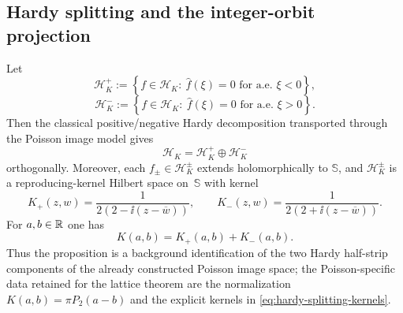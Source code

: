 
\subsection{Hardy splitting and the integer-orbit projection}

\begin{proposition}%
\label{prop:poisson-hardy-splitting}
Let
\[
\mathcal H_K^+
:=
\left\{
f\in\mathcal H_K:\ \widehat f(\xi)=0 \text{ for a.e. }\xi<0
\right\},
\]
\[
\mathcal H_K^-
:=
\left\{
f\in\mathcal H_K:\ \widehat f(\xi)=0 \text{ for a.e. }\xi>0
\right\}.
\]
Then the classical positive/negative Hardy decomposition transported through
the Poisson image model gives
\[
\mathcal H_K=\mathcal H_K^+\oplus \mathcal H_K^-
\]
orthogonally.  Moreover, each $f_\pm\in\mathcal H_K^\pm$ extends
holomorphically to $\mathbb S$, and $\mathcal H_K^\pm$ is a
reproducing-kernel Hilbert space on~$\mathbb S$ with kernel
\begin{equation}\label{eq:hardy-splitting-kernels}
K_+(z,w)=\frac{1}{2(2-\ii(z-\overline w))},
\qquad
K_-(z,w)=\frac{1}{2(2+\ii(z-\overline w))}.
\end{equation}
For $a,b\in\mathbb{R}$ one has
\begin{equation}\label{eq:hardy-splitting-real-kernel}
K(a,b)=K_+(a,b)+K_-(a,b).
\end{equation}
Thus the proposition is a background identification of the two Hardy
half-strip components of the already constructed Poisson image space; the
Poisson-specific data retained for the lattice theorem are the normalization
$K(a,b)=\pi P_2(a-b)$ and the explicit kernels in
\eqref{eq:hardy-splitting-kernels}.
\end{proposition}

